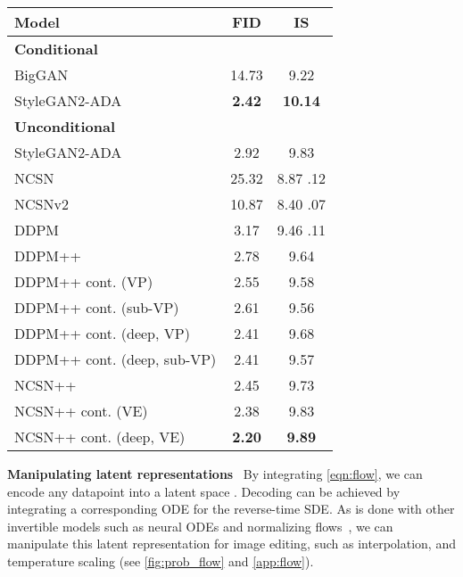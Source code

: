 \documentclass{article} \usepackage{iclr2021_conference,times}
\begin{document}
\begin{table}
\begin{minipage}[t]{0.48\textwidth}
\begin{table}[H]
\footnotesize
 \setlength\tabcolsep{3.5pt}
\begin{adjustbox}{max width=\textwidth}
  \begin{tabular}{lcc}
    \toprule
    Model & FID & IS  \\
        \midrule
      {\bf Conditional} & & \\
      \midrule
      BigGAN~\citep{brock2018large} & 14.73 & 9.22 \\
      StyleGAN2-ADA~\citep{karras2020training} & \textbf{2.42} & \textbf{10.14} \\
      \midrule
      {\bf Unconditional} & & \\
      \midrule
      StyleGAN2-ADA~\citep{karras2020training} & 2.92 & 9.83 \\
      NCSN~\citep{song2019generative} & 25.32 & 8.87  .12 \\
      NCSNv2~\citep{song2020improved} & 10.87 & 8.40  .07\\
      DDPM~\citep{ho2020denoising} & 3.17 & 9.46  .11\\
      \midrule
      DDPM++ & 2.78 & 9.64\\
      DDPM++ cont. (VP) & 2.55 & 9.58 \\
      DDPM++ cont. (sub-VP) & 2.61 & 9.56 \\
      DDPM++ cont. (deep, VP) & 2.41 & 9.68\\
      DDPM++ cont. (deep, sub-VP) & 2.41 & 9.57\\
      NCSN++ & 2.45 & 9.73 \\
      NCSN++ cont. (VE) & 2.38 & 9.83\\
      NCSN++ cont. (deep, VE) & \textbf{2.20} & \textbf{9.89}\\
    \bottomrule 
    \end{tabular}
\end{adjustbox}
\end{table}
\end{minipage}
\end{table}

\textbf{Manipulating latent representations}~ By integrating \cref{eqn:flow}, we can encode any datapoint  into a latent space . Decoding can be achieved by integrating a corresponding ODE for the reverse-time SDE. As is done with other invertible models such as neural ODEs and normalizing flows~\citep{dinh2016density,kingma2018glow}, we can manipulate this latent representation for image editing, such as interpolation, and temperature scaling (see \cref{fig:prob_flow} and \cref{app:flow}). 
\end{document}
